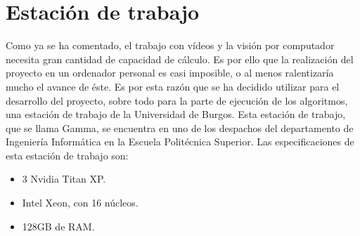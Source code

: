 \section{Estación de trabajo}
Como ya se ha comentado, el trabajo con vídeos y la visión por computador necesita gran cantidad de capacidad de cálculo. Es por ello que la realización del proyecto en un ordenador personal es casi imposible, o al menos ralentizaría mucho el avance de éste. Es por esta razón que se ha decidido utilizar para el desarrollo del proyecto, sobre todo para la parte de ejecución de los algoritmos, una estación de trabajo de la Universidad de Burgos. Esta estación de trabajo, que se llama Gamma, se encuentra en uno de los despachos del departamento de Ingeniería Informática en la Escuela Politécnica Superior. Las especificaciones de esta estación de trabajo son:
\begin{itemize}
	\item 3 Nvidia Titan XP.
	\item Intel Xeon, con 16 núcleos.
	\item 128GB de RAM.
\end{itemize}